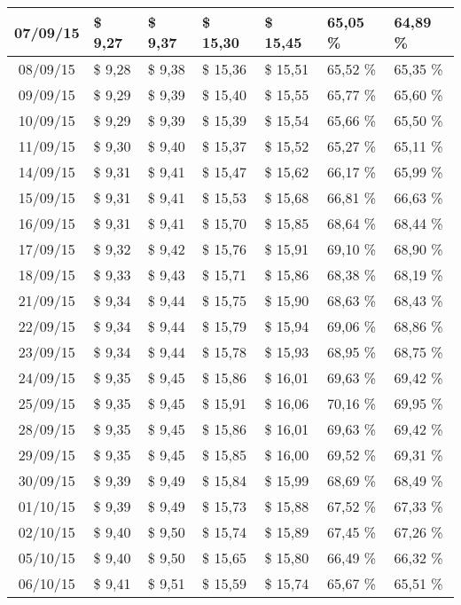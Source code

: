 \begin{center}
\begin{longtable}{|c|p{1.5cm}|p{1.5cm}|p{1.5cm}|p{1.5cm}|p{1.5cm}|p{1.5cm}|}
07/09/15 & \$ 9,27 & \$ 9,37 & \$ 15,30 & \$ 15,45 & 65,05 \% & 64,89 \% \\ \hline
08/09/15 & \$ 9,28 & \$ 9,38 & \$ 15,36 & \$ 15,51 & 65,52 \% & 65,35 \% \\ \hline
09/09/15 & \$ 9,29 & \$ 9,39 & \$ 15,40 & \$ 15,55 & 65,77 \% & 65,60 \% \\ \hline
10/09/15 & \$ 9,29 & \$ 9,39 & \$ 15,39 & \$ 15,54 & 65,66 \% & 65,50 \% \\ \hline
11/09/15 & \$ 9,30 & \$ 9,40 & \$ 15,37 & \$ 15,52 & 65,27 \% & 65,11 \% \\ \hline
14/09/15 & \$ 9,31 & \$ 9,41 & \$ 15,47 & \$ 15,62 & 66,17 \% & 65,99 \% \\ \hline
15/09/15 & \$ 9,31 & \$ 9,41 & \$ 15,53 & \$ 15,68 & 66,81 \% & 66,63 \% \\ \hline
16/09/15 & \$ 9,31 & \$ 9,41 & \$ 15,70 & \$ 15,85 & 68,64 \% & 68,44 \% \\ \hline
17/09/15 & \$ 9,32 & \$ 9,42 & \$ 15,76 & \$ 15,91 & 69,10 \% & 68,90 \% \\ \hline
18/09/15 & \$ 9,33 & \$ 9,43 & \$ 15,71 & \$ 15,86 & 68,38 \% & 68,19 \% \\ \hline
21/09/15 & \$ 9,34 & \$ 9,44 & \$ 15,75 & \$ 15,90 & 68,63 \% & 68,43 \% \\ \hline
22/09/15 & \$ 9,34 & \$ 9,44 & \$ 15,79 & \$ 15,94 & 69,06 \% & 68,86 \% \\ \hline
23/09/15 & \$ 9,34 & \$ 9,44 & \$ 15,78 & \$ 15,93 & 68,95 \% & 68,75 \% \\ \hline
24/09/15 & \$ 9,35 & \$ 9,45 & \$ 15,86 & \$ 16,01 & 69,63 \% & 69,42 \% \\ \hline
25/09/15 & \$ 9,35 & \$ 9,45 & \$ 15,91 & \$ 16,06 & 70,16 \% & 69,95 \% \\ \hline
28/09/15 & \$ 9,35 & \$ 9,45 & \$ 15,86 & \$ 16,01 & 69,63 \% & 69,42 \% \\ \hline
29/09/15 & \$ 9,35 & \$ 9,45 & \$ 15,85 & \$ 16,00 & 69,52 \% & 69,31 \% \\ \hline
30/09/15 & \$ 9,39 & \$ 9,49 & \$ 15,84 & \$ 15,99 & 68,69 \% & 68,49 \% \\ \hline
01/10/15 & \$ 9,39 & \$ 9,49 & \$ 15,73 & \$ 15,88 & 67,52 \% & 67,33 \% \\ \hline
02/10/15 & \$ 9,40 & \$ 9,50 & \$ 15,74 & \$ 15,89 & 67,45 \% & 67,26 \% \\ \hline
05/10/15 & \$ 9,40 & \$ 9,50 & \$ 15,65 & \$ 15,80 & 66,49 \% & 66,32 \% \\ \hline
06/10/15 & \$ 9,41 & \$ 9,51 & \$ 15,59 & \$ 15,74 & 65,67 \% & 65,51 \% \\ \hline

\end{longtable}
\end{center}
